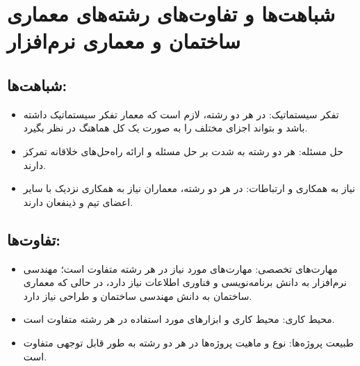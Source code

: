 \section*{شباهت‌ها و تفاوت‌های رشته‌های معماری ساختمان و معماری نرم‌افزار}
\subsection*{شباهت‌ها:}
\begin{itemize}
	\item تفکر سیستماتیک: در هر دو رشته، لازم است که معمار تفکر سیستماتیک داشته باشد و بتواند اجزای مختلف را به صورت یک کل هماهنگ در نظر بگیرد.
	\item حل مسئله: هر دو رشته به شدت بر حل مسئله و ارائه راه‌حل‌های خلاقانه تمرکز دارند.
	\item نیاز به همکاری و ارتباطات: در هر دو رشته، معماران نیاز به همکاری نزدیک با سایر اعضای تیم و ذینفعان دارند.
\end{itemize}

\subsection*{تفاوت‌ها:}
\begin{itemize}
	\item مهارت‌های تخصصی: مهارت‌های مورد نیاز در هر رشته متفاوت است؛ مهندسی نرم‌افزار به دانش برنامه‌نویسی و فناوری اطلاعات نیاز دارد، در حالی که معماری ساختمان به دانش مهندسی ساختمان و طراحی نیاز دارد.
	\item محیط کاری: محیط کاری و ابزارهای مورد استفاده در هر رشته متفاوت است.
	\item طبیعت پروژه‌ها: نوع و ماهیت پروژه‌ها در هر دو رشته به طور قابل توجهی متفاوت است.
\end{itemize}